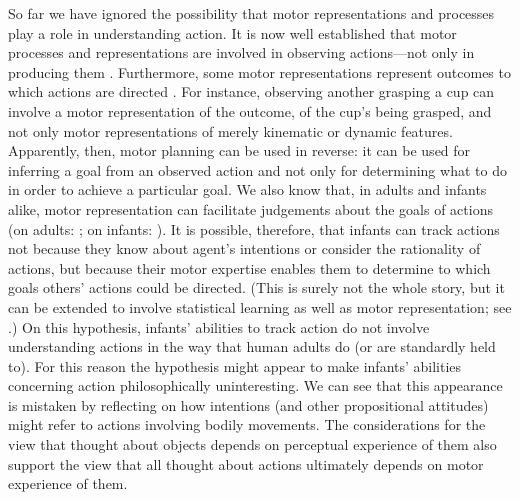 \documentclass[12pt,\papersize]{extarticle}
\begin{document}

So far we have ignored the possibility that motor representations and processes play a role in understanding action.
It is now well established that motor processes and representations are involved in observing actions---not only in producing them \citep{rizzolatti_functional_2010}.
Furthermore, some motor representations represent outcomes to which actions are directed \citep{jeannerod_motor_2006}. 
For instance, observing another grasping a cup can involve a motor representation of the outcome, of the cup's being grasped, and not only motor representations of merely kinematic or dynamic features.
Apparently, then, motor planning can be used in reverse: it can be used for inferring a goal from an observed action and not only for  determining what to do in order to achieve a particular goal.
We also know that, in adults and infants alike, motor representation can facilitate judgements about the goals of actions 
(on adults: \citealp{serino:2009_lesions_,pazzaglia:2008_sound_}; on infants: \citealp{bekkering:2000_imitation}).
It is possible, therefore, that infants can track actions not because they know about agent's intentions or consider the rationality of actions,
but because their motor expertise enables  them to  determine to which goals others' actions could be directed. 
(This is surely not the whole story, but it can be extended to involve statistical learning as well as motor representation; see \citet{paulus:2011_role}.)
On this hypothesis, infants' abilities to track action do not involve understanding actions in the way that human adults do (or are standardly held to). 
For this reason the hypothesis might  appear  to make infants' abilities concerning action philosophically uninteresting.
We can see that this appearance is mistaken by reflecting on how intentions (and other propositional attitudes) might refer to actions involving bodily movements.
The considerations for the view that 
thought about objects depends on perceptual experience of them  \citep[see][]{Campbell:2002ge} 
also support the view that 
all thought about actions ultimately depends on motor experience of them.
\end{document}
